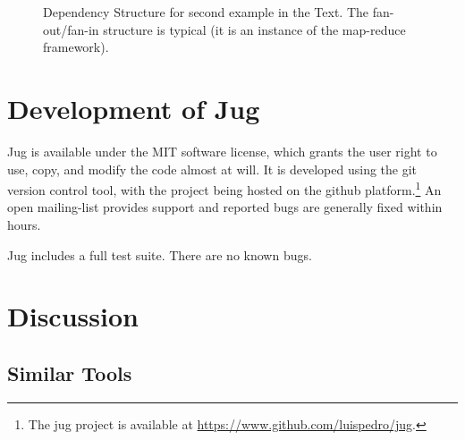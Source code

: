 \documentclass{article}
\begin{document}
\begin{figure}
\begin{center}

\end{center}
\caption{Dependency Structure for second example in the Text. The
fan-out/fan-in structure is typical (it is an instance of the map-reduce
framework).}
\label{fig:jug-deps-complex}
\end{figure}

\section{Development of Jug}
Jug is available under the MIT software license, which grants the user right to
use, copy, and modify the code almost at will. It is developed using the git
version control tool, with the project being hosted on the github
platform.\footnote{The jug project is available at
\url{https://www.github.com/luispedro/jug}.} An open mailing-list provides
support and reported bugs are generally fixed within hours.

Jug includes a full test suite. There are no known bugs.

\section{Discussion}

\subsection{Similar Tools}
\end{document}
